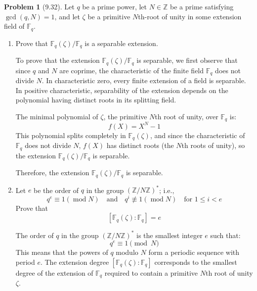 \documentclass[12pt]{article}
\theoremstyle{definition}
\newtheorem{problem}{Problem}
\DeclareMathOperator{\modd}{mod}
\begin{document}
\begin{problem}[9.32]
    Let $q$ be a prime power, let $N \in \mathbb{Z}$ be a prime satisfying $\gcd(q, N) = 1$, and let $\zeta$ be a primitive $N$th-root of unity in some extension field of $\mathbb{F}_q$.
    \begin{enumerate}[label=(\alph*)]
        \item Prove that $\mathbb{F}_q(\zeta)/\mathbb{F}_q$ is a separable extension.
        
        \begin{solution}
            To prove that the extension $\mathbb{F}_q(\zeta)/\mathbb{F}_q$ is separable, we first observe that since $q$ and $N$ are coprime, the characteristic of the finite field $\mathbb{F}_q$ does not divide $N$. In characteristic zero, every finite extension of a field is separable. In positive characteristic, separability of the extension depends on the polynomial having distinct roots in its splitting field.

            The minimal polynomial of $\zeta$, the primitive $N$th root of unity, over $\mathbb{F}_q$ is:
            \[
            f(X) = X^N - 1
            \]
            This polynomial splits completely in $\mathbb{F}_q(\zeta)$, and since the characteristic of $\mathbb{F}_q$ does not divide $N$, $f(X)$ has distinct roots (the $N$th roots of unity), so the extension $\mathbb{F}_q(\zeta)/\mathbb{F}_q$ is separable.

            Therefore, the extension $\mathbb{F}_q(\zeta)/\mathbb{F}_q$ is separable.
        \end{solution}

        \item Let $e$ be the order of $q$ in the group $(\mathbb{Z}/N\mathbb{Z})^*$; i.e.,
              \[
                  q^e \equiv 1 (\modd{N}) \quad \text{and} \quad q^i \not\equiv 1 (\modd{N}) \quad \text{for } 1 \leq i < e
              \]
              Prove that
              \[
                    [\mathbb{F}_q(\zeta) : \mathbb{F}_q] = e
              \]
        \begin{solution}
            The order of $q$ in the group $(\mathbb{Z}/N\mathbb{Z})^*$ is the smallest integer $e$ such that:
            \[
            q^e \equiv 1 \pmod{N}
            \]
            This means that the powers of $q$ modulo $N$ form a periodic sequence with period $e$. The extension degree $[\mathbb{F}_q(\zeta) : \mathbb{F}_q]$ corresponds to the smallest degree of the extension of $\mathbb{F}_q$ required to contain a primitive $N$th root of unity $\zeta$.


\end{solution}
\end{enumerate}
\end{problem}
\end{document}

